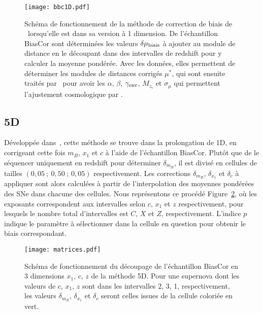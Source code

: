 \documentclass[../main/main.tex]{subfiles}
\begin{document}
\begin{figure}[]
    \centering
    \texttt{[image: bbc1D.pdf]}
    \caption[Schéma de fonctionnement de la méthode de correction de biais de
    \bbc1D]{Schéma de fonctionnement de la méthode de correction de biais de
        \bbc\ lorsqu'elle est dans sa version à 1 dimension. De l'échantillon
        BiasCor sont déterminées les valeurs $\delta\mu_{\rm biais}$ à ajouter
        au module de distance en le découpant dans des intervalles de redshift
        pour y calculer la moyenne pondérée. Avec les données, elles permettent
        de déterminer les modules de distances corrigés $\mu^*$, qui sont
        ensuite traités par \saltmu\ pour avoir les $\alpha$, $\beta$,
        $\gamma_{\rm env}$, $M_{z_i}$ et $\sigma_{\mu}$ qui permettent
    l'ajustement cosmologique par \wfit.}\label{fig:bbc1d}
\end{figure}

\subsection{\bbc5D}\label{ssec:bbc5D}

Développée dans~\cite{kessler2017}, cette méthode se trouve dans la prolongation
de \bbc1D, en corrigeant cette fois $m_B$, $x_1$ et $c$ à l'aide de
l'échantillon BiasCor. Plutôt que de le séquencer uniquement en redshift pour
déterminer $\delta_{m_B}$, il est divisé en cellules de tailles
$(0,05~;~0,50~;~0,05)$ respectivement. Les corrections $\delta_{m_B}$,
$\delta_{x_1}$ et $\delta_c$ à appliquer sont alors calculées à partir de
l'interpolation des moyennes pondérées des SNe dans chacune des cellules. Nous
représentons ce procédé Figure~\ref{fig:mat}, où les exposants correspondent aux
intervalles selon $c$, $x_1$ et $z$ respectivement, pour lesquels le nombre
total d'intervalles est $C$, $X$ et $Z$, respectivement. L'indice $p$ indique le
paramètre à sélectionner dans la cellule en question pour obtenir le biais
correspondant.

\begin{figure}[ht]
    \centering
    \texttt{[image: matrices.pdf]}
    \caption[Schéma de fonctionnement du découpage de l'échantillon BiasCor en 3
    dimensions $x_1$, $c$, $z$ de la méthode \bbc5D]{Schéma de
        fonctionnement du découpage de l'échantillon BiasCor en 3 dimensions
        $x_1$, $c$, $z$ de la méthode \bbc5D. Pour une supernova dont les
        valeurs de $c$, $x_1$, $z$ sont dans les intervalles 2, 3, 1,
        respectivement, les valeurs $\delta_{m_B}$, $\delta_{x_1}$ et $\delta_c$
    seront celles issues de la cellule coloriée en vert.}
    \label{fig:mat}
\end{figure}
\end{document}
